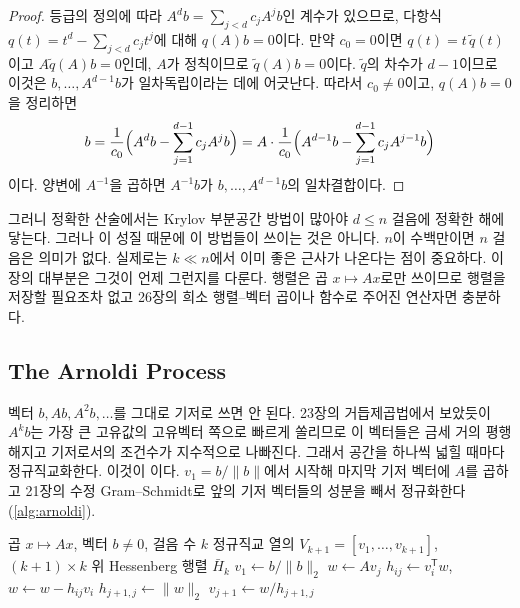 \begin{proof}
등급의 정의에 따라 $A^db=\sum_{j<d}c_jA^jb$인 계수가 있으므로, 다항식 $q(t)=t^d-\sum_{j<d}c_jt^j$에 대해 $q(A)b=0$이다. 만약 $c_0=0$이면 $q(t)=t\,\tilde q(t)$이고 $A\tilde q(A)b=0$인데, $A$가 정칙이므로 $\tilde q(A)b=0$이다. $\tilde q$의 차수가 $d-1$이므로 이것은 $b,\dots,A^{d-1}b$가 일차독립이라는 데에 어긋난다. 따라서 $c_0\ne0$이고, $q(A)b=0$을 정리하면
\[
b=\frac1{c_0}\Bigl(A^db-\sum_{j=1}^{d-1}c_jA^jb\Bigr)=A\cdot\frac1{c_0}\Bigl(A^{d-1}b-\sum_{j=1}^{d-1}c_jA^{j-1}b\Bigr)
\]
이다. 양변에 $A^{-1}$을 곱하면 $A^{-1}b$가 $b,\dots,A^{d-1}b$의 일차결합이다.
\end{proof}

그러니 정확한 산술에서는 Krylov 부분공간 방법이 많아야 $d\le n$ 걸음에 정확한 해에 닿는다. 그러나 이 성질 때문에 이 방법들이 쓰이는 것은 아니다. $n$이 수백만이면 $n$ 걸음은 의미가 없다. 실제로는 $k\ll n$에서 이미 좋은 근사가 나온다는 점이 중요하다. 이 장의 대부분은 그것이 언제 그런지를 다룬다. 행렬은 곱 $x\mapsto Ax$로만 쓰이므로 행렬을 저장할 필요조차 없고 26장의 희소 행렬--벡터 곱이나 함수로 주어진 연산자면 충분하다.

\subsection{The Arnoldi Process}

벡터 $b,Ab,A^2b,\dots$를 그대로 기저로 쓰면 안 된다. 23장의 거듭제곱법에서 보았듯이 $A^kb$는 가장 큰 고유값의 고유벡터 쪽으로 빠르게 쏠리므로 이 벡터들은 금세 거의 평행해지고 기저로서의 조건수가 지수적으로 나빠진다. 그래서 공간을 하나씩 넓힐 때마다 정규직교화한다. 이것이 이다\cite{arnoldi1951}. $v_1=b/\|b\|$에서 시작해 마지막 기저 벡터에 $A$를 곱하고 21장의 수정 Gram--Schmidt로 앞의 기저 벡터들의 성분을 빼서 정규화한다(\cref{alg:arnoldi}).

\begin{algorithm}[t]
\begin{algorithmic}[1]
\Require 곱 $x\mapsto Ax$, 벡터 $b\ne0$, 걸음 수 $k$
\Ensure 정규직교 열의 $V_{k+1}=[v_1,\dots,v_{k+1}]$, $(k+1)\times k$ 위 Hessenberg 행렬 $\bar H_k$
\State $v_1\gets b/\|b\|_2$
  \State $w\gets Av_j$
   
    \State $h_{ij}\gets v_i^{\mathsf T}w$, $w\gets w-h_{ij}v_i$
  \EndFor
  \State $h_{j+1,j}\gets\|w\|_2$
   \Return {}
  \EndIf
  \State $v_{j+1}\gets w/h_{j+1,j}$
\EndFor
\end{algorithmic}
\caption{Arnoldi 과정}
\label{alg:arnoldi}
\end{algorithm}

